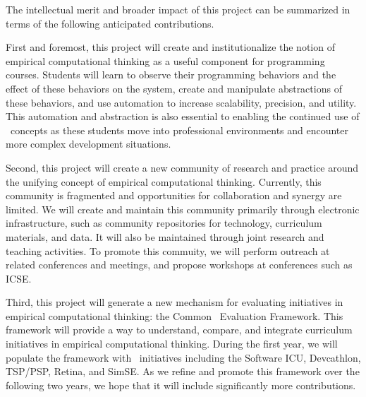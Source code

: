 

The intellectual merit and broader impact of this project can be summarized
in terms of the following anticipated contributions.

First and foremost, this project will create and institutionalize the
notion of empirical computational thinking as a useful component for
programming courses.  Students will learn to observe their programming
behaviors and the effect of these behaviors on the system, create and
manipulate abstractions of these behaviors, and use automation to increase
scalability, precision, and utility.  This automation and abstraction is also
essential to enabling the continued use of \eCT\ concepts as these students
move into professional environments and encounter more complex development
situations.

Second, this project will create a new community of research and practice
around the unifying concept of empirical computational thinking.
Currently, this community is fragmented and opportunities for collaboration
and synergy are limited.  We will create and maintain this community
primarily through electronic infrastructure, such as community repositories
for technology, curriculum materials, and data.  It will also be maintained
through joint research and teaching activities.  To promote this commuity,
we will perform outreach at related conferences and meetings, and propose
workshops at conferences such as ICSE.

Third, this project will generate a new mechanism for evaluating initiatives
in empirical computational thinking: the Common \eCT\ Evaluation
Framework.  This framework will provide a way to understand, compare, and
integrate curriculum initiatives in empirical computational thinking.
During the first year, we will populate the framework with \eCT\
initiatives including the Software ICU, Devcathlon, TSP/PSP, Retina, and
SimSE.  As we refine and promote this framework over the following two
years, we hope that it will include significantly more contributions.

